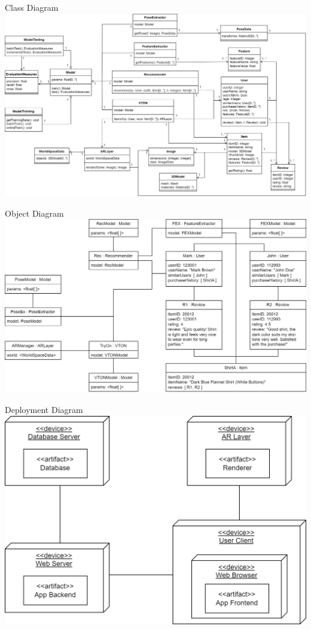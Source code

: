 \begin{frame}{Class Diagram}
	\includegraphics[width=\textwidth]{components/images/class.png}
\end{frame}

\begin{frame}{Object Diagram}
	\includegraphics[width=\textwidth]{components/images/object.png}
\end{frame}

\begin{frame}{Deployment Diagram}
	\centering
	\includegraphics[width=0.85 \textwidth]{components/images/deployment.png}
\end{frame}

